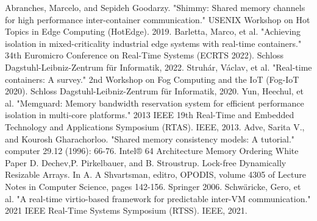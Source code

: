 \documentclass[a4paper, 11pt, twocolumn]{article}
\theoremstyle{nonumberplain}
\begin{document}
% 

\begin{thebibliography}{10}
     Abranches, Marcelo, and Sepideh Goodarzy.
        "Shimmy: Shared memory channels for high performance inter-container
        communication." USENIX Workshop on Hot Topics in Edge Computing
        (HotEdge). 2019.
        Barletta, Marco, et al. "Achieving isolation in mixed-criticality
        industrial edge systems with real-time containers." 34th Euromicro
        Conference on Real-Time Systems (ECRTS 2022). Schloss
        Dagstuhl-Leibniz-Zentrum für Informatik, 2022.
        Struhár, Václav, et al. "Real-time containers: A survey."
        2nd Workshop on Fog Computing and the IoT (Fog-IoT 2020).
        Schloss Dagstuhl-Leibniz-Zentrum für Informatik, 2020.
        Yun, Heechul, et al.
        "Memguard: Memory bandwidth reservation system
        for efficient performance isolation in multi-core
        platforms." 2013 IEEE 19th Real-Time and Embedded
        Technology and Applications Symposium (RTAS). IEEE, 2013.
        Adve, Sarita V., and Kourosh Gharachorloo.
        "Shared memory consistency models: A tutorial."
        computer 29.12 (1996): 66-76.
     Intel® 64 Architecture Memory Ordering White Paper
        D. Dechev,P. Pirkelbauer, and B. Stroustrup.
        Lock-free Dynamically Resizable Arrays.
        In A. A Shvartsman, editro, OPODIS,
        volume 4305 of Lecture Notes in Computer Science,
        pages 142-156.
        Springer 2006.
        Schwäricke, Gero, et al. "A real-time virtio-based framework for
        predictable inter-VM communication." 2021 IEEE Real-Time Systems
        Symposium (RTSS). IEEE, 2021.
\end{thebibliography}
\end{document}
